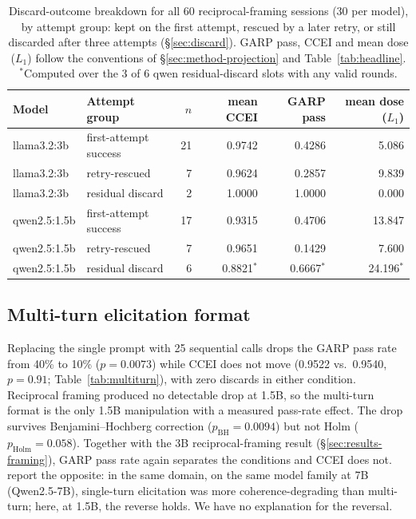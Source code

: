 \documentclass{article}
\begin{document}
\begin{table}[h]
\centering
\footnotesize
\caption{Discard-outcome breakdown for all 60 reciprocal-framing sessions (30 per model), by
attempt group: kept on the first attempt, rescued by a later retry, or still discarded after three
attempts (\S\ref{sec:discard}). GARP pass, CCEI and mean dose ($L_1$) follow the conventions of
\S\ref{sec:method-projection} and Table~\ref{tab:headline}. $^*$Computed over the 3 of 6 qwen
residual-discard slots with any valid rounds.}
\label{tab:discardbreakdown}
\begin{tabular}{llrrrr}
\toprule
Model & Attempt group & $n$ & mean CCEI & GARP pass & mean dose ($L_1$) \\
\midrule
llama3.2:3b  & first-attempt success & 21 & 0.9742 & 0.4286 & 5.086 \\
llama3.2:3b  & retry-rescued         & 7  & 0.9624 & 0.2857 & 9.839 \\
llama3.2:3b  & residual discard      & 2  & 1.0000 & 1.0000 & 0.000 \\
\midrule
qwen2.5:1.5b & first-attempt success & 17 & 0.9315 & 0.4706 & 13.847 \\
qwen2.5:1.5b & retry-rescued         & 7  & 0.9651 & 0.1429 & 7.600 \\
qwen2.5:1.5b & residual discard      & 6  & 0.8821$^*$ & 0.6667$^*$ & 24.196$^*$ \\
\bottomrule
\end{tabular}
\end{table}

\subsection{Multi-turn elicitation format}
\label{sec:results-multiturn}

Replacing the single prompt with 25 sequential calls drops the GARP pass rate from 40\% to
10\% ($p=0.0073$) while CCEI does not move (0.9522 vs.\ 0.9540, $p=0.91$;
Table~\ref{tab:multiturn}), with zero discards in either condition. Reciprocal framing produced no
detectable drop at 1.5B, so the multi-turn format is the only 1.5B manipulation with a measured
pass-rate effect. The drop survives Benjamini--Hochberg correction ($p_{\mathrm{BH}}=0.0094$) but
not Holm ($p_{\mathrm{Holm}}=0.058$). Together with the 3B reciprocal-framing result
(\S\ref{sec:results-framing}), GARP pass rate again separates the conditions and CCEI does not.
\citet{wang2025tactics} report the opposite: in the same domain, on the same model
family at 7B (Qwen2.5-7B), single-turn elicitation was more coherence-degrading
than multi-turn; here, at 1.5B, the reverse holds. We have no explanation for the reversal.
\end{document}
